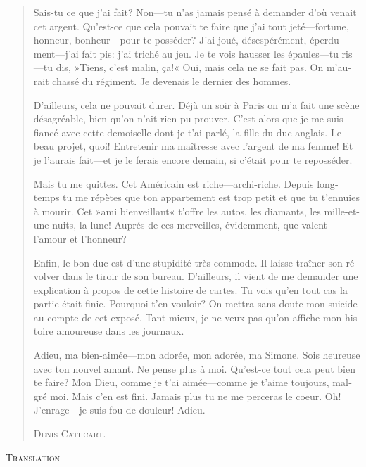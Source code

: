 \begin{quotation}
\begin{french}
Sais-tu ce que j'ai fait? Non—tu n'as jamais pensé à demander d'où
venait cet argent. Qu'est-ce que cela pouvait te faire que j'ai
tout jeté—fortune, honneur, bonheur—pour te posséder? J'ai joué,
désespérément, éperdument—j'ai fait pis: j'ai triché au jeu. Je te
vois hausser les épaules—tu ris—tu dis, »Tiens, c'est malin, ça!«
Oui, mais cela ne se fait pas. On m'aurait chassé du régiment. Je
devenais le dernier des hommes.

D'ailleurs, cela ne pouvait durer. Déjà un soir à Paris on m'a fait
une scène désagréable, bien qu'on n'ait rien pu prouver. C'est alors
que je me suis fiancé avec cette demoiselle dont je t'ai parlé, la
fille du duc anglais. Le beau projet, quoi! Entretenir ma maîtresse
avec l'argent de ma femme! Et je l'aurais fait—et je le ferais encore
demain, si c'était pour te reposséder.

Mais tu me quittes. Cet Américain est riche—archi-riche. Depuis
longtemps tu me répètes que ton appartement est trop petit et que tu
t'ennuies à mourir. Cet »ami bienveillant« t'offre les autos, les
diamants, les mille-et-une nuits, la lune! Auprés de ces merveilles,
évidemment, que valent l'amour et l'honneur?

Enfin, le bon duc est d'une stupidité très commode. Il laisse traîner son révolver dans le tiroir de son bureau. D'ailleurs, il vient de me
demander une explication à propos de cette histoire de cartes. Tu vois
qu'en tout cas la partie était finie. Pourquoi t'en vouloir? On mettra
sans doute mon suicide au compte de cet exposé. Tant mieux, je ne veux
pas qu'on affiche mon histoire amoureuse dans les journaux.

Adieu, ma bien-aimée—mon adorée, mon adorée, ma Simone. Sois
heureuse avec ton nouvel amant. Ne pense plus à moi. Qu'est-ce tout
cela peut bien te faire? Mon Dieu, comme je t'ai aimée—comme je
t'aime toujours, malgré moi. Mais c'en est fini. Jamais plus tu ne me
perceras le coeur. Oh! J'enrage—je suis fou de douleur! Adieu.

\begin{flushright}
\textsc{Denis Cathcart.}
\end{flushright}
\end{french}
\end{quotation}

\makeatletter
{}
{%
  \clearpage
}{%
    
}
\makeatother


\begin{center}
\textsc{Translation}
\end{center}

